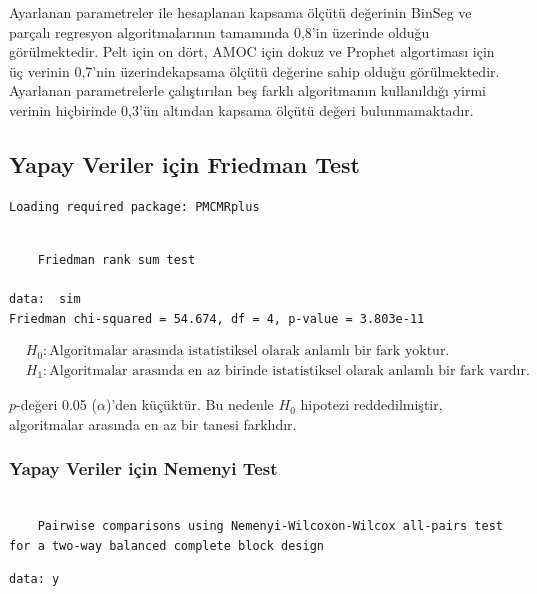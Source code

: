 \documentclass[12pt,twoside]{deuthesis}
\begin{document}
Ayarlanan parametreler ile hesaplanan kapsama ölçütü değerinin BinSeg ve parçalı regresyon algoritmalarının tamamında 0,8'in üzerinde olduğu görülmektedir. Pelt için on dört, AMOC için dokuz ve Prophet algortiması için üç verinin 0,7'nin üzerindekapsama ölçütü değerine sahip olduğu görülmektedir.
Ayarlanan parametrelerle çalıştırılan beş farklı algoritmanın kullanıldığı yirmi verinin hiçbirinde 0,3'ün altından kapsama ölçütü değeri bulunmamaktadır.

\hypertarget{yapay-veriler-iuxe7in-friedman-test}{%
\subsection{Yapay Veriler için Friedman Test}\label{yapay-veriler-iuxe7in-friedman-test}}

\begin{verbatim}
Loading required package: PMCMRplus
\end{verbatim}

\begin{verbatim}

    Friedman rank sum test

data:  sim
Friedman chi-squared = 54.674, df = 4, p-value = 3.803e-11
\end{verbatim}

\begin{align*}
& H_0: \text{Algoritmalar arasında istatistiksel olarak anlamlı bir fark yoktur.} \\
& H_1: \text{Algoritmalar arasında en az birinde istatistiksel olarak anlamlı bir fark vardır.}
\end{align*}

\(p\)-değeri 0.05 (\(\alpha\))'den küçüktür. Bu nedenle \(H_0\) hipotezi reddedilmiştir, algoritmalar arasında en az bir tanesi farklıdır.

\hypertarget{yapay-veriler-iuxe7in-nemenyi-test}{%
\subsubsection{Yapay Veriler için Nemenyi Test}\label{yapay-veriler-iuxe7in-nemenyi-test}}

\begin{verbatim}

    Pairwise comparisons using Nemenyi-Wilcoxon-Wilcox all-pairs test for a two-way balanced complete block design
\end{verbatim}

\begin{verbatim}
data: y
\end{verbatim}
\end{document}
